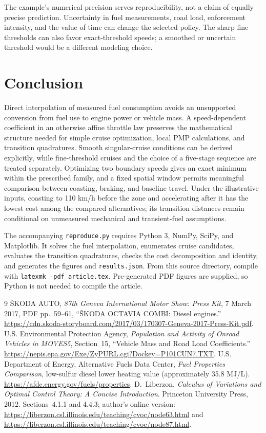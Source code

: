 \documentclass[conference,a4paper]{IEEEtran}
\begin{document}
The example's numerical precision serves reproducibility, not a claim of equally precise prediction. Uncertainty in fuel measurements, road load, enforcement intensity, and the value of time can change the selected policy. The sharp fine thresholds can also favor exact-threshold speeds; a smoothed or uncertain threshold would be a different modeling choice.

\section{Conclusion}
Direct interpolation of measured fuel consumption avoids an unsupported conversion from fuel use to engine power or vehicle mass. A speed-dependent coefficient in an otherwise affine throttle law preserves the mathematical structure needed for simple cruise optimization, local PMP calculations, and transition quadratures. Smooth singular-cruise conditions can be derived explicitly, while fine-threshold cruises and the choice of a five-stage sequence are treated separately. Optimizing two boundary speeds gives an exact minimum within the prescribed family, and a fixed spatial window permits meaningful comparison between coasting, braking, and baseline travel. Under the illustrative inputs, coasting to 110 km/h before the zone and accelerating after it has the lowest cost among the compared alternatives; its transition distances remain conditional on unmeasured mechanical and transient-fuel assumptions.

\appendix[Reproducibility]
The accompanying \texttt{reproduce.py} requires Python 3, NumPy, SciPy, and Matplotlib. It solves the fuel interpolation, enumerates cruise candidates, evaluates the transition quadratures, checks the cost decomposition and identity, and generates the figures and \texttt{results.json}. From this source directory, compile with \texttt{latexmk -pdf article.tex}. Pre-generated PDF figures are supplied, so Python is not needed to compile the article.

\begin{thebibliography}{9}
\v{S}KODA AUTO, \emph{87th Geneva International Motor Show: Press Kit}, 7 March 2017, PDF pp.~59--61, ``\v{S}KODA OCTAVIA COMBI: Diesel engines.''
\url{https://cdn.skoda-storyboard.com/2017/03/170307-Geneva-2017-Press-Kit.pdf}.
U.S. Environmental Protection Agency, \emph{Population and Activity of Onroad Vehicles in MOVES5}, Section~15, ``Vehicle Mass and Road Load Coefficients.''
\url{https://nepis.epa.gov/Exe/ZyPURL.cgi?Dockey=P101CUN7.TXT}.
U.S. Department of Energy, Alternative Fuels Data Center, \emph{Fuel Properties Comparison}, low-sulfur diesel lower heating value (approximately 35.8 MJ/L).
\url{https://afdc.energy.gov/fuels/properties}.
D.~Liberzon, \emph{Calculus of Variations and Optimal Control Theory: A Concise Introduction}. Princeton University Press, 2012. Sections~4.1.1 and 4.4.3; author's online version:
\url{https://liberzon.csl.illinois.edu/teaching/cvoc/node63.html} and
\url{https://liberzon.csl.illinois.edu/teaching/cvoc/node87.html}.
\end{thebibliography}
\end{document}
